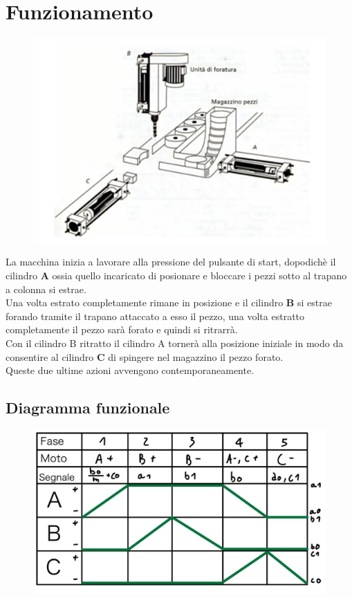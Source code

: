 \documentclass[12pt]{article}
\begin{document}
\section{Funzionamento}
\begin{figure}[h]
	\centering
	\includegraphics[scale=0.05]{schema-macchina.png}
\end{figure}
\noindent
La macchina inizia a lavorare alla pressione del pulsante di start, dopodichè il cilindro \textbf{A} ossia quello incaricato di posionare e
bloccare i pezzi sotto al trapano a colonna si estrae.\\
Una volta estrato completamente rimane in posizione e il cilindro \textbf{B} si estrae forando tramite il trapano attaccato a esso il pezzo,
una volta estratto completamente il pezzo sarà forato e quindi si ritrarrà.\\
Con il cilindro B ritratto il cilindro A tornerà alla posizione iniziale in modo da consentire al cilindro \textbf{C} di spingere nel
magazzino il pezzo forato.\\
Queste due ultime azioni avvengono contemporaneamente.\\
\subsection{Diagramma funzionale}
\begin{figure}[!h]
	\centering
	\includegraphics[scale=0.2]{sfunzionale.jpg}
\end{figure}
\end{document}
